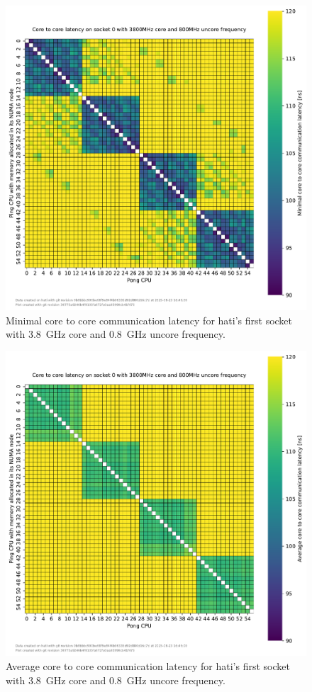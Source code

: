 \begin{figure}[]
    \centering
    \includegraphics[width=\columnwidth]{fig/core-to-core-latency/core-to-core-heatmap-min-3800-800.pdf}
    \caption{Minimal core to core communication latency for hati's first socket with \SI{3.8}{\GHz} core and \SI{0.8}{\GHz} uncore frequency.}
\end{figure}
\begin{figure}[]
    \centering
    \includegraphics[width=\columnwidth]{fig/core-to-core-latency/core-to-core-heatmap-avg-3800-800.pdf}
    \caption{Average core to core communication latency for hati's first socket with \SI{3.8}{\GHz} core and \SI{0.8}{\GHz} uncore frequency.}
\end{figure}
